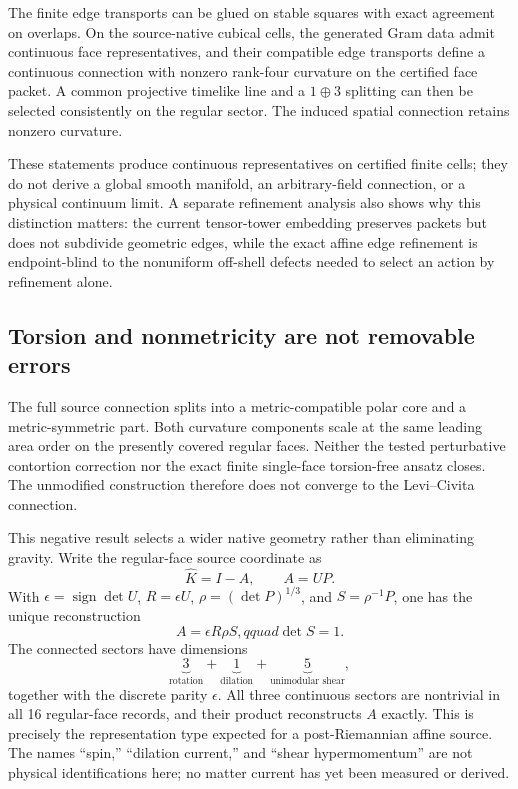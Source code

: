 \documentclass[11pt]{article}
\theoremstyle{definition}
\theoremstyle{remark}
\begin{document}
The finite edge transports can be glued on stable squares with exact agreement on overlaps. On the source-native cubical cells, the generated Gram data admit continuous face representatives, and their compatible edge transports define a continuous connection with nonzero rank-four curvature on the certified face packet. A common projective timelike line and a $1\oplus3$ splitting can then be selected consistently on the regular sector. The induced spatial connection retains nonzero curvature.

These statements produce continuous representatives on certified finite cells; they do not derive a global smooth manifold, an arbitrary-field connection, or a physical continuum limit. A separate refinement analysis also shows why this distinction matters: the current tensor-tower embedding preserves packets but does not subdivide geometric edges, while the exact affine edge refinement is endpoint-blind to the nonuniform off-shell defects needed to select an action by refinement alone.

\subsection{Torsion and nonmetricity are not removable errors}

The full source connection splits into a metric-compatible polar core and a metric-symmetric part. Both curvature components scale at the same leading area order on the presently covered regular faces. Neither the tested perturbative contortion correction nor the exact finite single-face torsion-free ansatz closes. The unmodified construction therefore does not converge to the Levi--Civita connection.

This negative result selects a wider native geometry rather than eliminating gravity. Write the regular-face source coordinate as
\begin{equation}\label{eq:polar}
 \widehat K=I-A,\qquad A=UP.
\end{equation}
With $\epsilon=\operatorname{sign}\det U$, $R=\epsilon U$, $\rho=(\det P)^{1/3}$, and $S=\rho^{-1}P$, one has the unique reconstruction
\begin{equation}\label{eq:hypermomentum}
 A=\epsilon R\rho S,qquad \det S=1.
\end{equation}
The connected sectors have dimensions
\begin{equation}\label{eq:315}
 \underbrace{3}_{\text{rotation}}
 +\underbrace{1}_{\text{dilation}}
 +\underbrace{5}_{\text{unimodular shear}},
\end{equation}
together with the discrete parity $\epsilon$. All three continuous sectors are nontrivial in all 16 regular-face records, and their product reconstructs $A$ exactly. This is precisely the representation type expected for a post-Riemannian affine source. The names ``spin,'' ``dilation current,'' and ``shear hypermomentum'' are not physical identifications here; no matter current has yet been measured or derived.
\end{document}
